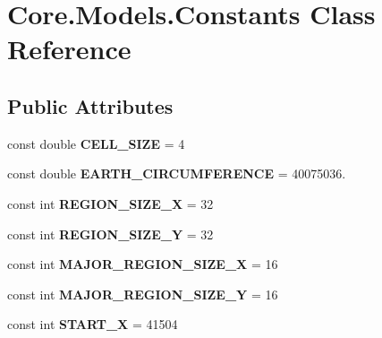 \hypertarget{classCore_1_1Models_1_1Constants}{\section{Core.\-Models.\-Constants Class Reference}
\label{classCore_1_1Models_1_1Constants}
}
\subsection*{Public Attributes}
\begin{DoxyCompactItemize}
\item 
\hypertarget{classCore_1_1Models_1_1Constants_adde91f87a25a57db171667f80b72d69f}{const double {\bfseries C\-E\-L\-L\-\_\-\-S\-I\-Z\-E} = 4}\label{classCore_1_1Models_1_1Constants_adde91f87a25a57db171667f80b72d69f}

\item 
\hypertarget{classCore_1_1Models_1_1Constants_ad31578c20b30dd96faf43b7a9f7b0389}{const double {\bfseries E\-A\-R\-T\-H\-\_\-\-C\-I\-R\-C\-U\-M\-F\-E\-R\-E\-N\-C\-E} = 40075036.}\label{classCore_1_1Models_1_1Constants_ad31578c20b30dd96faf43b7a9f7b0389}

\item 
\hypertarget{classCore_1_1Models_1_1Constants_a2d02174b6a70404c1d8093c81eb47cb2}{const int {\bfseries R\-E\-G\-I\-O\-N\-\_\-\-S\-I\-Z\-E\-\_\-\-X} = 32}\label{classCore_1_1Models_1_1Constants_a2d02174b6a70404c1d8093c81eb47cb2}

\item 
\hypertarget{classCore_1_1Models_1_1Constants_ad7f91cdefc9377eb37c98a50e0d1c068}{const int {\bfseries R\-E\-G\-I\-O\-N\-\_\-\-S\-I\-Z\-E\-\_\-\-Y} = 32}\label{classCore_1_1Models_1_1Constants_ad7f91cdefc9377eb37c98a50e0d1c068}

\item 
\hypertarget{classCore_1_1Models_1_1Constants_a26b3d6b0c7f17fdac4b0789c3a6adec6}{const int {\bfseries M\-A\-J\-O\-R\-\_\-\-R\-E\-G\-I\-O\-N\-\_\-\-S\-I\-Z\-E\-\_\-\-X} = 16}\label{classCore_1_1Models_1_1Constants_a26b3d6b0c7f17fdac4b0789c3a6adec6}

\item 
\hypertarget{classCore_1_1Models_1_1Constants_ad49dbef4256b0be04e921acc8bcef4a8}{const int {\bfseries M\-A\-J\-O\-R\-\_\-\-R\-E\-G\-I\-O\-N\-\_\-\-S\-I\-Z\-E\-\_\-\-Y} = 16}\label{classCore_1_1Models_1_1Constants_ad49dbef4256b0be04e921acc8bcef4a8}

\item 
\hypertarget{classCore_1_1Models_1_1Constants_a04216f06fce4df1266355ba32c59ac21}{const int {\bfseries S\-T\-A\-R\-T\-\_\-\-X} = 41504}\label{classCore_1_1Models_1_1Constants_a04216f06fce4df1266355ba32c59ac21}


\end{DoxyCompactItemize}
